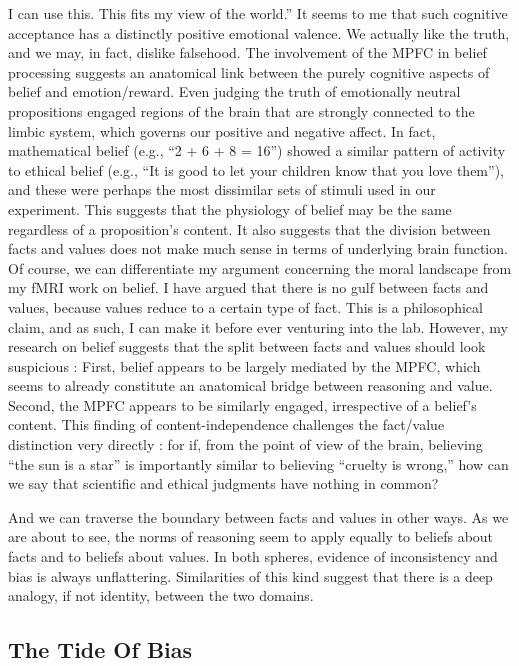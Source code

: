 \documentclass[a4paper,14pt]{extarticle}
\begin{document}
I can use this.
This fits my view of the world.''
It seems to me that such cognitive acceptance has a distinctly positive emotional valence.
We actually like the truth, and we may, in fact, dislike falsehood.
The involvement of the MPFC in belief processing suggests an anatomical link between the purely cognitive aspects of belief and emotion/reward.
Even judging the truth of emotionally neutral propositions engaged regions of the brain that are strongly connected to the limbic system, which governs our positive and negative affect.
In fact, mathematical belief (e.g., ``2 + 6 + 8 = 16'') showed a similar pattern of activity to ethical belief (e.g., ``It is good to let your children know that you love them''), and these were perhaps the most dissimilar sets of stimuli used in our experiment.
This suggests that the physiology of belief may be the same regardless of a proposition’s content.
It also suggests that the division between facts and values does not make much sense in terms of underlying brain function.
Of course, we can differentiate my argument concerning the moral landscape from my fMRI work on belief.
I have argued that there is no gulf between facts and values, because values reduce to a certain type of fact.
This is a philosophical claim, and as such, I can make it before ever venturing into the lab.
However, my research on belief suggests that the split between facts and values should look suspicious :
First, belief appears to be largely mediated by the MPFC, which seems to already constitute an anatomical bridge between reasoning and value.
Second, the MPFC appears to be similarly engaged, irrespective of a belief’s content.
This finding of content-independence challenges the fact/value distinction very directly :
for if, from the point of view of the brain, believing ``the sun is a star'' is importantly similar to believing ``cruelty is wrong,'' how can we say that scientific and ethical judgments have nothing in common?

And we can traverse the boundary between facts and values in other ways.
As we are about to see, the norms of reasoning seem to apply equally to beliefs about facts and to beliefs about values.
In both spheres, evidence of inconsistency and bias is always unflattering.
Similarities of this kind suggest that there is a deep analogy, if not identity, between the two domains.

\subsection{The Tide Of Bias}
\end{document}
